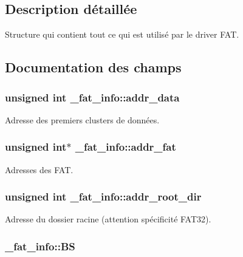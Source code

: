 \subsection{\-Description détaillée}
\-Structure qui contient tout ce qui est utilisé par le driver \-F\-A\-T. 

\subsection{\-Documentation des champs}
\hypertarget{struct__fat__info_a4cb2766e74dd65f24d4eb30ce3b49302}{
\subsubsection[{addr\-\_\-data}]{\setlength{\rightskip}{0pt plus 5cm}unsigned int {\bf \-\_\-fat\-\_\-info\-::addr\-\_\-data}}}\label{struct__fat__info_a4cb2766e74dd65f24d4eb30ce3b49302}
\-Adresse des premiers clusters de données. \hypertarget{struct__fat__info_a0344193eb413dce4369b6e36ed03b92b}{
\subsubsection[{addr\-\_\-fat}]{\setlength{\rightskip}{0pt plus 5cm}unsigned int$\ast$ {\bf \-\_\-fat\-\_\-info\-::addr\-\_\-fat}}}\label{struct__fat__info_a0344193eb413dce4369b6e36ed03b92b}
\-Adresses des \-F\-A\-T. \hypertarget{struct__fat__info_ae9133d320e0afc89c5e6cc9cedf6dfb5}{
\subsubsection[{addr\-\_\-root\-\_\-dir}]{\setlength{\rightskip}{0pt plus 5cm}unsigned int {\bf \-\_\-fat\-\_\-info\-::addr\-\_\-root\-\_\-dir}}}\label{struct__fat__info_ae9133d320e0afc89c5e6cc9cedf6dfb5}
\-Adresse du dossier racine (attention spécificité \-F\-A\-T32). \hypertarget{struct__fat__info_adcd12930a4a7f94ecac42ba82567adb7}{
\subsubsection[{\-B\-S}]{ {\bf \-\_\-fat\-\_\-info\-::\-B\-S}}}\label{struct__fat__info_adcd12930a4a7f94ecac42ba82567adb7}
